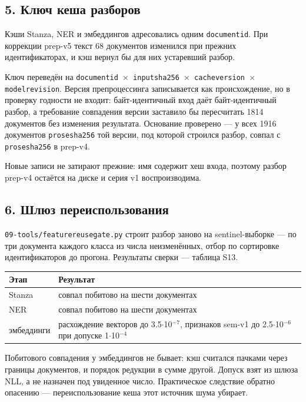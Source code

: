 \documentclass[11pt,a4paper]{article}
\renewcommand{\_}{\textunderscore\allowbreak}
\begin{document}
\subsection{5. Ключ кеша разборов}

Кэши Stanza, NER и эмбеддингов адресовались одним \texttt{document\_id}. При коррекции prep-v5 текст 68 документов изменился при прежних идентификаторах, и кэш вернул бы для них устаревший разбор.

Ключ переведён на \texttt{document\_id $\times$ input\_sha256 $\times$ cache\_version $\times$ model\_revision}. Версия препроцессинга записывается как происхождение, но в проверку годности не входит: байт-идентичный вход даёт байт-идентичный разбор, а требование совпадения версии заставило бы пересчитать 1814 документов без изменения результата. Основание проверено — у всех 1916 документов \texttt{prose\_sha256} той версии, под которой строился разбор, совпал с \texttt{prose\_sha256} в prep-v4.

Новые записи не затирают прежние: имя содержит хеш входа, поэтому разбор prep-v4 остаётся на диске и серия v1 воспроизводима.

\subsection{6. Шлюз переиспользования}

\texttt{09-\allowbreak{}tools/feature\_reuse\_gate.py} строит разбор заново на sentinel-выборке — по три документа каждого класса из числа неизменённых, отбор по сортировке идентификаторов до прогона. Результаты сверки — таблица S13.

\begin{center}
\small
\begin{tabularx}{\textwidth}{lX}
\toprule
Этап & Результат \\
\midrule
Stanza & совпал побитово на шести документах \\
NER & совпал побитово на шести документах \\
эмбеддинги & расхождение векторов до 3.5$\cdot$10$^{-7}$, признаков sem-v1 до 2.5$\cdot$10$^{-6}$ при допуске 1$\cdot$10$^{-4}$ \\
\bottomrule
\end{tabularx}
\end{center}

Побитового совпадения у эмбеддингов не бывает: кэш считался пачками через границы документов, и порядок редукции в сумме другой. Допуск взят из шлюза NLL, а не назначен под увиденное число. Практическое следствие обратно опасению — переиспользование кеша этот источник шума убирает.
\end{document}
